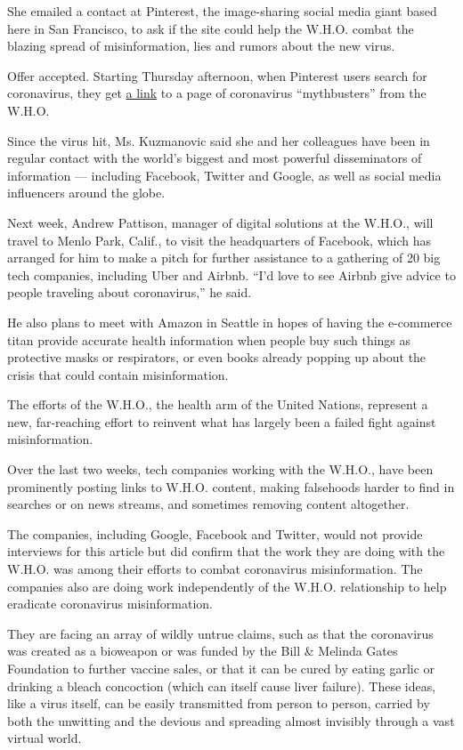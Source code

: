 She emailed a contact at Pinterest, the image-sharing social media giant
based here in San Francisco, to ask if the site could help the W.H.O.
combat the blazing spread of misinformation, lies and rumors about the
new virus.

Offer accepted. Starting Thursday afternoon, when Pinterest users search
for coronavirus, they get
\href{https://web.archive.org/web/20200206210009/https://www.pinterest.ch/worldhealthorganization/2019-ncov-new-coronavirus/}{a
link} to a page of coronavirus ``mythbusters'' from the W.H.O.

Since the virus hit, Ms. Kuzmanovic said she and her colleagues have
been in regular contact with the world's biggest and most powerful
disseminators of information --- including Facebook, Twitter and Google,
as well as social media influencers around the globe.

Next week, Andrew Pattison, manager of digital solutions at the W.H.O.,
will travel to Menlo Park, Calif., to visit the headquarters of
Facebook, which has arranged for him to make a pitch for further
assistance to a gathering of 20 big tech companies, including Uber and
Airbnb. ``I'd love to see Airbnb give advice to people traveling about
coronavirus,'' he said.

He also plans to meet with Amazon in Seattle in hopes of having the
e-commerce titan provide accurate health information when people buy
such things as protective masks or respirators, or even books already
popping up about the crisis that could contain misinformation.

The efforts of the W.H.O., the health arm of the United Nations,
represent a new, far-reaching effort to reinvent what has largely been a
failed fight against misinformation.

Over the last two weeks, tech companies working with the W.H.O., have
been prominently posting links to W.H.O. content, making falsehoods
harder to find in searches or on news streams, and sometimes removing
content altogether.

The companies, including Google, Facebook and Twitter, would not provide
interviews for this article but did confirm that the work they are doing
with the W.H.O. was among their efforts to combat coronavirus
misinformation. The companies also are doing work independently of the
W.H.O. relationship to help eradicate coronavirus misinformation.

They are facing an array of wildly untrue claims, such as that the
coronavirus was created as a bioweapon or was funded by the Bill \&
Melinda Gates Foundation to further vaccine sales, or that it can be
cured by eating garlic or drinking a bleach concoction (which can itself
cause liver failure). These ideas, like a virus itself, can be easily
transmitted from person to person, carried by both the unwitting and the
devious and spreading almost invisibly through a vast virtual world.

